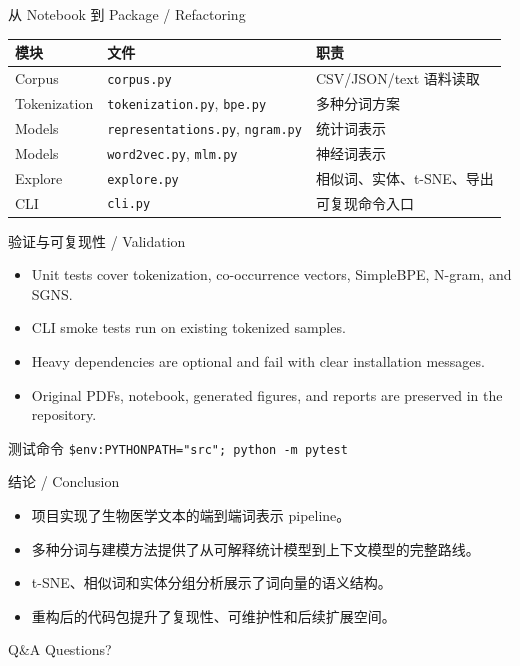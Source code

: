 \documentclass[aspectratio=169,10pt]{ctexbeamer}
\begin{document}
\begin{frame}{从 Notebook 到 Package / Refactoring}
  \begin{table}
    \centering
    \begin{tabular}{lll}
      \toprule
      模块 & 文件 & 职责 \\
      \midrule
      Corpus & \texttt{corpus.py} & CSV/JSON/text 语料读取 \\
      Tokenization & \texttt{tokenization.py}, \texttt{bpe.py} & 多种分词方案 \\
      Models & \texttt{representations.py}, \texttt{ngram.py} & 统计词表示 \\
      Models & \texttt{word2vec.py}, \texttt{mlm.py} & 神经词表示 \\
      Explore & \texttt{explore.py} & 相似词、实体、t-SNE、导出 \\
      CLI & \texttt{cli.py} & 可复现命令入口 \\
      \bottomrule
    \end{tabular}
  \end{table}
\end{frame}

\begin{frame}{验证与可复现性 / Validation}
  \begin{itemize}
    \item Unit tests cover tokenization, co-occurrence vectors, SimpleBPE, N-gram, and SGNS.
    \item CLI smoke tests run on existing tokenized samples.
    \item Heavy dependencies are optional and fail with clear installation messages.
    \item Original PDFs, notebook, generated figures, and reports are preserved in the repository.
  \end{itemize}
  \begin{block}{测试命令}
    \texttt{\$env:PYTHONPATH="src"; python -m pytest}
  \end{block}
\end{frame}

\begin{frame}{结论 / Conclusion}
  \begin{itemize}
    \item 项目实现了生物医学文本的端到端词表示 pipeline。
    \item 多种分词与建模方法提供了从可解释统计模型到上下文模型的完整路线。
    \item t-SNE、相似词和实体分组分析展示了词向量的语义结构。
    \item 重构后的代码包提升了复现性、可维护性和后续扩展空间。
  \end{itemize}
\end{frame}

\begin{frame}{Q\&A}
  \centering
  \Huge Questions?
\end{frame}
\end{document}
